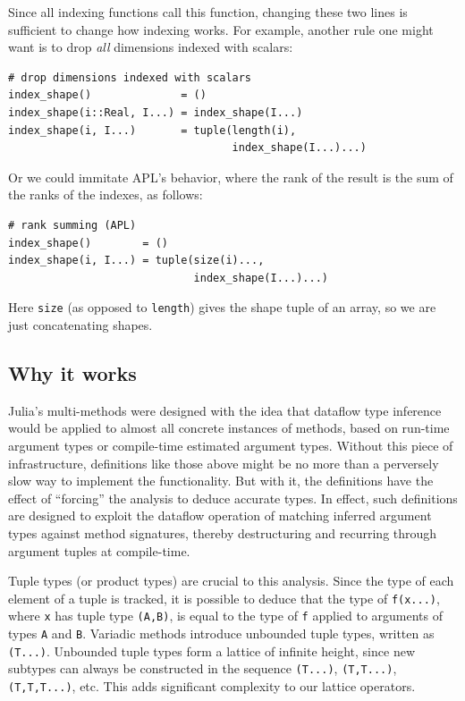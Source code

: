 \documentclass[preprint]{sigplanconf}
\newcommand{\code}[1]{\texttt{#1}}
\begin{document}
Since all indexing functions call this function, changing these two lines is
sufficient to change how indexing works. For example, another rule one might
want is to drop \emph{all} dimensions indexed with scalars:

{\small
\begin{verbatim}
# drop dimensions indexed with scalars
index_shape()              = ()
index_shape(i::Real, I...) = index_shape(I...)
index_shape(i, I...)       = tuple(length(i),
                                   index_shape(I...)...)
\end{verbatim}
}

Or we could immitate APL's behavior, where the rank of the result is the sum
of the ranks of the indexes, as follows:

{\small
\begin{verbatim}
# rank summing (APL)
index_shape()        = ()
index_shape(i, I...) = tuple(size(i)...,
                             index_shape(I...)...)
\end{verbatim}
}

Here \code{size} (as opposed to \code{length}) gives the shape tuple of an array,
so we are just concatenating shapes.


\subsection{Why it works}

Julia's multi-methods were designed with the idea that dataflow type inference
\cite{Cousot:1977, kaplanullman}
would be applied to almost all concrete instances of methods, based on
run-time argument types or compile-time estimated argument types. Without this
piece of infrastructure, definitions like those above might be no more
than a perversely slow way to implement the functionality. But with it, the
definitions have the effect of ``forcing'' the analysis to deduce accurate
types. In effect, such definitions are designed to exploit the dataflow
operation of matching inferred argument types against method signatures,
thereby destructuring and recurring through argument tuples at compile-time.

Tuple types (or product types) are crucial to this analysis. Since the type
of each element of a tuple is tracked, it is possible to deduce that
the type of \code{f(x...)}, where \code{x} has tuple type \code{(A,B)}, is
equal to the type of \code{f} applied to arguments of types \code{A} and
\code{B}. Variadic methods introduce unbounded tuple types, written as
\code{(T...)}. Unbounded tuple types form a lattice of infinite height,
since new subtypes can always be constructed in the sequence
\code{(T...)}, \code{(T,T...)}, \code{(T,T,T...)}, etc. This adds
significant complexity to our lattice operators.
\end{document}
